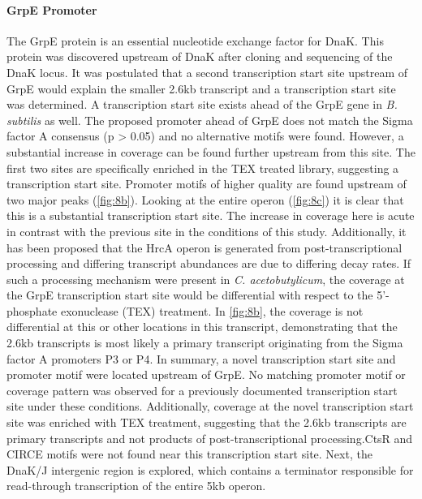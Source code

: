 \paragraph{GrpE Promoter}
The GrpE protein is an essential nucleotide exchange factor for DnaK. This protein was discovered upstream of DnaK after cloning and sequencing of the DnaK locus\cite{79}. It was postulated that a second transcription start site upstream of GrpE would explain the smaller 2.6kb transcript and a transcription start site was determined\cite{79}. A transcription start site exists ahead of the GrpE gene in \textit{B. subtilis} as well\cite{82}. The proposed promoter ahead of GrpE does not match the Sigma factor A consensus (p > 0.05) and no alternative motifs were found. However, a substantial increase in coverage can be found further upstream from this site. The first two sites are specifically enriched in the TEX treated library, suggesting a transcription start site. Promoter motifs of higher quality are found upstream of two major peaks (\ref{fig:8b}). Looking at the entire operon (\ref{fig:8c}) it is clear that this is a substantial transcription start site. The increase in coverage here is acute in contrast with the previous site in the conditions of this study. Additionally, it has been proposed that the HrcA operon is generated from post-transcriptional processing and differing transcript abundances are due to differing decay rates\cite{82}. If such a processing mechanism were present in \textit{C. acetobutylicum}, the coverage at the GrpE transcription start site would be differential with respect to the 5'-phosphate exonuclease (TEX) treatment. In \ref{fig:8b}, the coverage is not differential at this or other locations in this transcript, demonstrating that the 2.6kb transcripts is most likely a primary transcript originating from the Sigma factor A promoters P3 or P4. In summary, a novel transcription start site and promoter motif were located upstream of GrpE. No matching promoter motif or coverage pattern was observed for a previously documented transcription start site under these conditions. Additionally, coverage at the novel transcription start site was enriched with TEX treatment, suggesting that the 2.6kb transcripts are primary transcripts and not products of post-transcriptional processing.CtsR and CIRCE motifs were not found near this transcription start site. Next, the DnaK/J intergenic region is explored, which contains a terminator responsible for read-through transcription of the entire 5kb operon.

